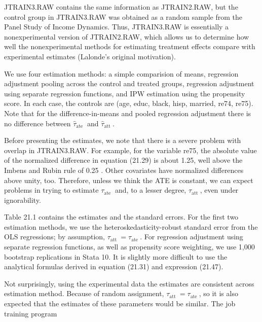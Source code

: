 \documentclass[10pt]{article}
\begin{document}
JTRAIN3.RAW contains the same information as JTRAIN2.RAW, but the control group in JTRAIN3.RAW was obtained as a random sample from the Panel Study of Income Dynamics. Thus, JTRAIN3.RAW is essentially a nonexperimental version of JTRAIN2.RAW, which allows us to determine how well the nonexperimental methods for estimating treatment effects compare with experimental estimates (Lalonde's original motivation).

We use four estimation methods: a simple comparision of means, regression adjustment pooling across the control and treated groups, regression adjustment using separate regression functions, and IPW estimation using the propensity score. In each case, the controls are (age, educ, black, hisp, married, re74, re75). Note that for the difference-in-means and pooled regression adjustment there is no difference between $\hat{\tau}_{\text {ate }}$ and $\hat{\tau}_{\text {att }}$.

Before presenting the estimates, we note that there is a severe problem with overlap in JTRAIN3.RAW. For example, for the variable re75, the absolute value of the normalized difference in equation (21.29) is about 1.25, well above the Imbens and Rubin rule of 0.25 . Other covariates have normalized differences above unity, too. Therefore, unless we think the ATE is constant, we can expect problems in trying to estimate $\tau_{\text {ate }}$ and, to a lesser degree, $\tau_{\text {att }}$, even under ignorability.

Table 21.1 contains the estimates and the standard errors. For the first two estimation methods, we use the heteroskedasticity-robust standard error from the OLS regressions; by assumption, $\tau_{\text {att }}=\tau_{\text {ate }}$. For regression adjustment using separate regression functions, as well as propensity score weighting, we use 1,000 bootstrap replications in Stata 10. It is slightly more difficult to use the analytical formulas derived in equation (21.31) and expression (21.47).

Not surprisingly, using the experimental data the estimates are consistent across estimation method. Because of random assignment, $\tau_{\text {att }}=\tau_{\text {ate }}$, so it is also expected that the estimates of these parameters would be similar. The job training program
\end{document}
